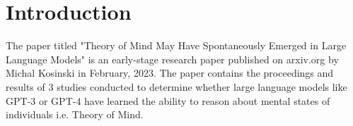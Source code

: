 \section{Introduction}

The paper titled "Theory of Mind May Have Spontaneously Emerged in Large Language Models" is an early-stage research paper published on arxiv.org by Michal Kosinski in February, 2023. The paper contains the proceedings and results of 3 studies conducted to determine whether large language models like GPT-3 or GPT-4 have learned the ability to reason about mental states of individuals i.e. Theory of Mind. 